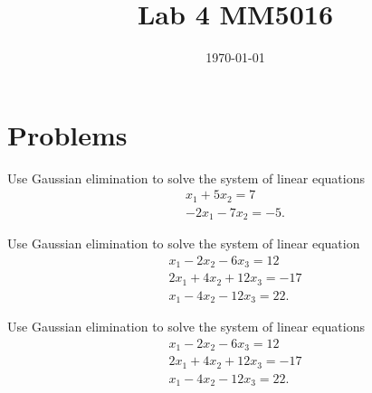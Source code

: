 \documentclass[10pt]{article}
\date{\today}
\title{Lab 4 MM5016}
\begin{document}
\maketitle


\section{Problems}
\label{sec:orgf8091d2}

\begin{exercise}[System 1]  \label{exe:System_1}
Use Gaussian elimination to solve the system of linear equations
\begin{align*}
x_1 + 5x_2 = 7 \\
-2x_1 -7x_2 = -5
.
\end{align*}
\end{exercise}
\begin{exercise}[System 2]  \label{exe:System_2}
Use Gaussian elimination to solve the system of linear equation
\begin{align*}
x_1 - 2x_2 - 6x_3 = 12 \\
2x_1 + 4x_2 + 12x_3 = -17 \\
x_1 - 4x_2 - 12x_3 = 22
.
\end{align*}
\end{exercise}
\begin{exercise}[System 3]  \label{exe:System_3}
Use Gaussian elimination to solve the system of linear equations
\begin{align*}
x_1 - 2x_2 -6x_3 = 12 \\
2x_1 + 4x_2 + 12x_3 = -17 \\
x_1 - 4x_2 - 12x_3 = 22
.
\end{align*}
\end{exercise}
\end{document}
